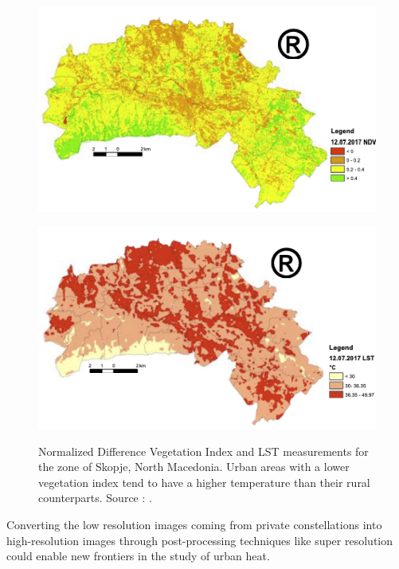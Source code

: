     \begin{figure}[H]
        \centering
        \begin{minipage}{0.5\textwidth}
            \centering
            \includegraphics[width=\textwidth]{includes/1-skopje-NDVI.png}
            \label{fig:1-skopje-NDVI}
        \end{minipage}\hfill
        \begin{minipage}{0.5\textwidth}
            \centering
            \includegraphics[width=\textwidth]{includes/1-skopje-LST.png}
            \label{fig:1-skopje-LST}
        \end{minipage}
        \caption{Normalized Difference Vegetation Index \cite{Rouse1973MonitoringVS} and LST measurements for the zone of Skopje, North Macedonia. Urban areas with a lower vegetation index tend to have a higher temperature than their rural counterparts. Source : \cite{skopje2018}.} 
        \label{fig:1-skopie-UHI}
    \end{figure}

    Converting the low resolution images coming from private constellations into high-resolution images through post-processing techniques like super resolution could enable new frontiers in the study of urban heat. 


